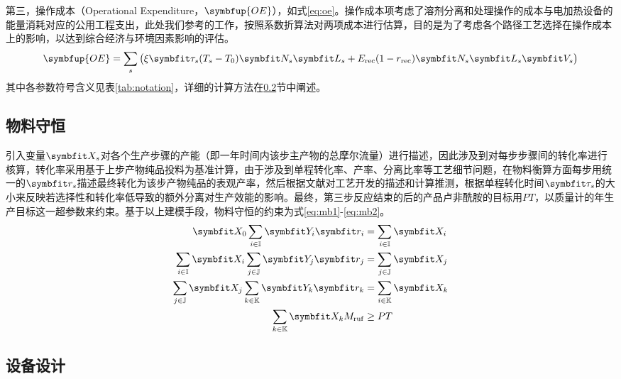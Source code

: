 第三，操作成本（Operational Expenditure，$\symbfup{OE}$），如式\eqref{eq:oe}。操作成本项考虑了溶剂分离和处理操作的成本与电加热设备的能量消耗对应的公用工程支出，此处我们参考\cite{diab2018}的工作，按照系数折算法\cite{garrett2012}对两项成本进行估算，目的是为了考虑各个路径工艺选择在操作成本上的影响，以达到综合经济与环境因素影响的评估。
\begin{align}
  \symbfup{OE} = \sum_s \big(\xi\symbfit\tau_s(T_s-T_0)\symbfit N_s\symbfit L_s +E_{\rm rec}(1-r_{\rm rec})\symbfit N_s\symbfit L_s\symbfit V_s\big) \label{eq:oe}
\end{align}
其中各参数符号含义见表\ref{tab:notation}，详细的计算方法在\ref{section:shebei}节中阐述。

\subsection{物料守恒}

引入变量$\symbfit X_s$对各个生产步骤的产能（即一年时间内该步主产物的总摩尔流量）进行描述，因此涉及到对每步步骤间的转化率进行核算，转化率采用基于上步产物纯品投料为基准计算，由于涉及到单程转化率、产率、分离比率等工艺细节问题，在物料衡算方面每步用统一的$\symbfit r_s$描述最终转化为该步产物纯品的表观产率，然后根据文献对工艺开发的描述和计算推测，根据单程转化时间$\symbfit \tau_s$的大小来反映若选择性和转化率低导致的额外分离对生产效能的影响。最终，第三步反应结束的后的产品卢非酰胺的目标用$PT$，以质量计的年生产目标这一超参数来约束。基于以上建模手段，物料守恒的约束为式\eqref{eq:mb1}-\eqref{eq:mb2}。
\begin{align}
  \symbfit X_0\sum_{i\in\mathbb I}\symbfit Y_i\symbfit r_i&=\sum_{i\in\mathbb I}\symbfit X_i \label{eq:mb1} \\
  \sum_{i\in\mathbb I}\symbfit X_i\sum_{j\in\mathbb J}\symbfit Y_j\symbfit r_j&=\sum_{j\in\mathbb J}\symbfit X_j \\
  \sum_{j\in\mathbb J}\symbfit X_j\sum_{k\in\mathbb K}\symbfit Y_k\symbfit r_k&=\sum_{i\in\mathbb K}\symbfit X_k \\
  \sum_{k\in\mathbb K}\symbfit X_kM_{\rm ruf}&\ge PT \label{eq:mb2}
\end{align}

\subsection{设备设计}
\label{section:shebei}

